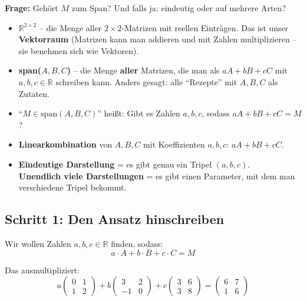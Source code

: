 \documentclass[a4paper,12pt]{article}
\begin{document}
\textbf{Frage:} Geh\"ort $M$ zum Span? Und falls ja: eindeutig oder auf mehrere Arten?

\begin{begriffe}
\begin{itemize}[leftmargin=*, nosep]
    \item $\mathbb{R}^{2 \times 2}$ -- die Menge aller $2 \times 2$-Matrizen mit reellen Eintr\"agen. Das ist unser \textbf{Vektorraum} (Matrizen kann man addieren und mit Zahlen multiplizieren -- sie benehmen sich wie Vektoren).
    \item \textbf{span($A, B, C$)} -- die Menge \textbf{aller} Matrizen, die man als $a A + b B + c C$ mit $a,b,c \in \mathbb{R}$ schreiben kann. Anders gesagt: alle ``Rezepte'' mit $A, B, C$ als Zutaten.
    \item ``$M \in \text{span}(A,B,C)$'' hei\ss t: Gibt es Zahlen $a, b, c$, sodass $aA + bB + cC = M$?
    \item \textbf{Linearkombination} von $A, B, C$ mit Koeffizienten $a, b, c$: $aA + bB + cC$.
    \item \textbf{Eindeutige Darstellung} = es gibt genau ein Tripel $(a,b,c)$.\\
    \textbf{Unendlich viele Darstellungen} = es gibt einen Parameter, mit dem man verschiedene Tripel bekommt.
\end{itemize}
\end{begriffe}

\subsection*{Schritt 1: Den Ansatz hinschreiben}

Wir wollen Zahlen $a, b, c \in \mathbb{R}$ finden, sodass:
\[
a \cdot A + b \cdot B + c \cdot C = M
\]

Das ausmultipliziert:
\[
a \begin{pmatrix} 0 & 1 \\ 1 & 2 \end{pmatrix}
+ b \begin{pmatrix} 3 & 2 \\ -1 & 0 \end{pmatrix}
+ c \begin{pmatrix} 3 & 6 \\ 3 & 8 \end{pmatrix}
= \begin{pmatrix} 6 & 7 \\ 1 & 6 \end{pmatrix}
\]
\end{document}
